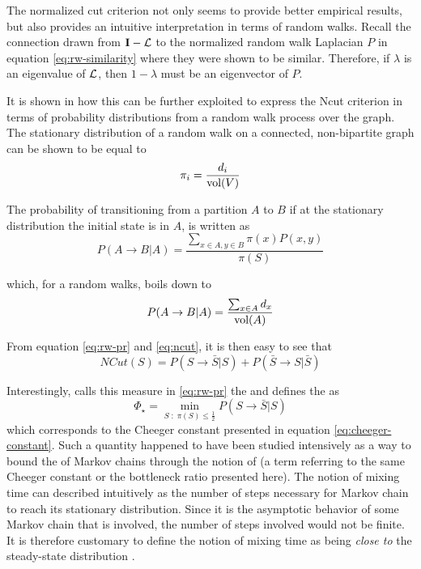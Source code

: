 The normalized cut criterion not only seems to provide better empirical results, but also
provides an intuitive interpretation in terms of random walks. Recall the connection
drawn from $\mathbf{I} - \mathbf{\mathcal{L}}$ to the normalized random walk Laplacian $P$ in
equation \ref{eq:rw-similarity} where they were shown to be similar. Therefore, if
$\lambda$ is an eigenvalue of $\mathbf{\mathcal{L}}$, then $1 - \lambda$ must be an eigenvector
of $P$. 

It is shown in \cite{Shi2001} how this can be further exploited to express the Ncut
criterion in terms of probability distributions from a random walk process over the
graph. The stationary distribution of a random walk on a connected, non-bipartite graph
can be shown \cite{Levin2008} to be equal to
\begin{equation}
\pi_i = \frac{d_i}{\operatorname{\text{vol}}(V)}
\end{equation}

The probability of transitioning from a partition $A$ to $B$ if at the stationary distribution the initial state is in $A$, is written as
\begin{equation}
P(A \to B | A) = \frac{\sum_{x \in A, y \in B} \pi(x) P(x, y)}{\pi(S)}
\label{eq:rw-pr}
\end{equation}

which, for a random walks, boils down to 
\begin{equation}
P(A \to B | A) = \frac{\sum_{x \in A} d_x}{\operatorname{\text{vol}}(A)}
\end{equation}

From equation \ref{eq:rw-pr} and \ref{eq:ncut}, it is then easy to see that
\begin{equation}
NCut(S) = P(S \to \bar{S} | S) + P(\bar{S} \to S | \bar{S})
\end{equation}

Interestingly, \cite{Levin2008} calls this measure in \ref{eq:rw-pr} the
 and defines the 
as 
\begin{equation}
\Phi_\star = \min_{S\; : \;\pi(S) \leq \frac{1}{2}} P(S \to \bar{S} | S)
\end{equation}
which corresponds to the Cheeger constant presented in equation 
\ref{eq:cheeger-constant}. Such a quantity happened to have been studied intensively as
a way to bound the  of Markov chains through the notion of
 (a term referring to the same Cheeger constant or the bottleneck
ratio presented here). The notion of mixing time can described intuitively as the number
of steps necessary for Markov chain to reach its stationary distribution. Since it is the asymptotic behavior of some Markov chain that is involved, the number of steps involved would not be finite. It is therefore customary to define the notion of mixing time as being \textit{close to} the steady-state distribution \cite{Jerrum1988}.

